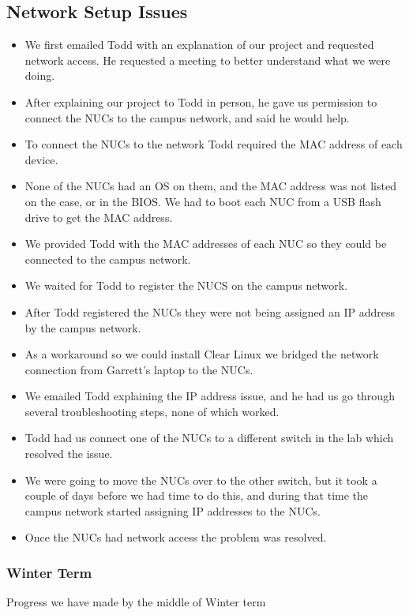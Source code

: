 \documentclass[pdf]{beamer}
\begin{document}
\begin{frame}[allowframebreaks]
	\subsection{Network Setup Issues}
	\begin{itemize}
		\item We first emailed Todd with an explanation of our project and 
			requested network access. He requested a meeting to better 
			understand what we were doing.
		\item After explaining our project to Todd in person, he gave us 
			permission to connect the NUCs to the campus network, and said he 
			would help.
		\item To connect the NUCs to the network Todd required the MAC address 
			of each device.
		\item None of the NUCs had an OS on them, and the MAC address was not 
			listed on the case, or in the BIOS.
			We had to boot each NUC from a USB flash drive to get the MAC 
			address.
		\item We provided Todd with the MAC addresses of each NUC so they could 
			be connected to the campus network.
		\item We waited for Todd to register the NUCS on the campus network.
		\item After Todd registered the NUCs they were not being assigned an IP 
			address by the campus network.
		\item As a workaround so we could install Clear Linux we bridged the 
			network connection from Garrett's laptop to the NUCs.
		\item We emailed Todd explaining the IP address issue, and he had us go
			through several troubleshooting steps, none of which worked.
		\item Todd had us connect one of the NUCs to a different switch in the 
			lab which resolved the issue.
		\item We were going to move the NUCs over to the other switch, but it 
			took a couple of days before we had time to do this, and during 
			that time the campus network started assigning IP addresses to the 
			NUCs.
		\item Once the NUCs had network access the problem was resolved.
	\end{itemize}

\end{frame}

\begin{frame}
	\frametitle{Winter Term}
	Progress we have made by the middle of Winter term
\end{frame}
\end{document}
